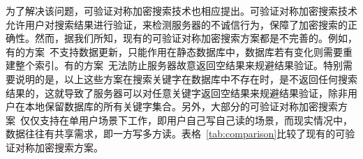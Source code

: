 为了解决该问题，可验证对称加密搜索技术也相应提出\cite{kamara2011cs2,kurosawa2012uc,chai2012verifiable,kurosawa2013update,stefanov2014practical,cheng2015verifiable,bost2016verifiable,ogataefficient}。可验证对称加密搜索技术允许用户对搜索结果进行验证，来检测服务器的不诚信行为，保障了加密搜索的正确性。然而，据我们所知，现有的可验证对称加密搜索方案都是不完善的。例如，有的方案~\cite{kurosawa2012uc,chai2012verifiable,cheng2015verifiable,ogataefficient}不支持数据更新，只能作用在静态数据库中，数据库若有变化则需要重建整个索引。有的方案~\cite{kamara2011cs2,kurosawa2013update,stefanov2014practical}无法防止服务器故意返回空结果来规避结果验证。特别需要说明的是，以上这些方案\cite{kamara2011cs2,kurosawa2013update,stefanov2014practical}在搜索关键字在数据库中不存在时，是不返回任何搜索结果的，这就导致了服务器可以对任意关键字返回空结果来规避结果验证，除非用户在本地保留数据库的所有关键字集合。另外，大部分的可验证对称加密搜索方案~\cite{kamara2011cs2,kurosawa2012uc,chai2012verifiable,kurosawa2013update,stefanov2014practical,
cheng2015verifiable,ogataefficient,bost2016verifiable}仅仅支持在单用户场景下工作，即用户自己写自己读的场景，而现实情况中，数据往往有共享需求，即一方写多方读。表格~\ref{tab:comparison}比较了现有的可验证对称加密搜索方案。


